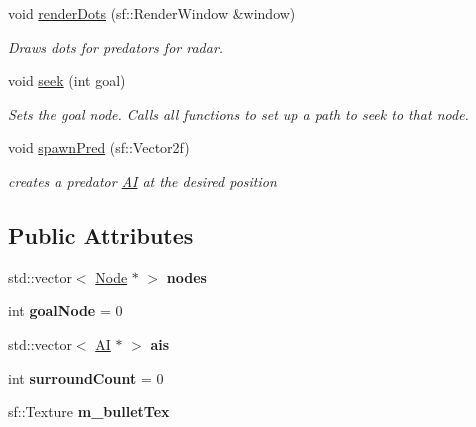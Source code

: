 \begin{DoxyCompactItemize}
void \mbox{\hyperlink{class_grid_aa58165416bcc766774296f0c8b057d2b}{render\+Dots}} (sf\+::\+Render\+Window \&window)
\begin{DoxyCompactList}\small\item\em Draws dots for predators for radar. \end{DoxyCompactList}\item 
void \mbox{\hyperlink{class_grid_ada242a904e942e6d4a97f458ea3e7ae7}{seek}} (int goal)
\begin{DoxyCompactList}\small\item\em Sets the goal node. Calls all functions to set up a path to seek to that node. \end{DoxyCompactList}\item 
void \mbox{\hyperlink{class_grid_a2e1a97e06b3d2fcc27e2ea40e80f1f85}{spawn\+Pred}} (sf\+::\+Vector2f)
\begin{DoxyCompactList}\small\item\em creates a predator \mbox{\hyperlink{class_a_i}{AI}} at the desired position \end{DoxyCompactList}\end{DoxyCompactItemize}
\subsection*{Public Attributes}
\begin{DoxyCompactItemize}
\item 
\mbox{\label{class_grid_a76523519ea42021931d2a5a1674b43ad}} 
std\+::vector$<$ \mbox{\hyperlink{class_node}{Node}} $\ast$ $>$ {\bfseries nodes}
\item 
\mbox{\label{class_grid_a89f7df50d91e3535998bc7c4185bdf49}} 
int {\bfseries goal\+Node} = 0
\item 
\mbox{\label{class_grid_a0e2434a63726be11c36d1c0cb7d37913}} 
std\+::vector$<$ \mbox{\hyperlink{class_a_i}{AI}} $\ast$ $>$ {\bfseries ais}
\item 
\mbox{\label{class_grid_ae47956131b1101bf7478d662394d43ad}} 
int {\bfseries surround\+Count} = 0
\item 
\mbox{\label{class_grid_a272eb2251ef1279b708a80628d30ddf4}} 
sf\+::\+Texture {\bfseries m\+\_\+bullet\+Tex}
\end{DoxyCompactItemize}
